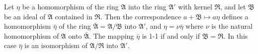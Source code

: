 Let $\eta$ be a homomorphism of the ring $\mathfrak{A}$ into the ring $\mathfrak{A}'$ with kernel $\mathfrak{R}$, and let $\mathfrak{B}$ be an ideal of $\mathfrak{A}$ contained in $\mathfrak{R}$. Then the correspondence $a + \mathfrak{B} \mapsto a\eta$ defines a homomorphism $\bar{\eta}$ of the ring $\bar{\mathfrak{A}} = \mathfrak{A}/\mathfrak{B}$ into $\mathfrak{A}'$, and $\eta = \nu\bar{\eta}$ where $\nu$ is the natural homomorphism of $\mathfrak{A}$ onto $\bar{\mathfrak{A}}$. The mapping $\bar{\eta}$ is 1-1 if and only if $\mathfrak{B} = \mathfrak{R}$. In this case $\bar{\eta}$ is an isomorphism of $\mathfrak{A}/\mathfrak{R}$ into $\mathfrak{A}'$.
